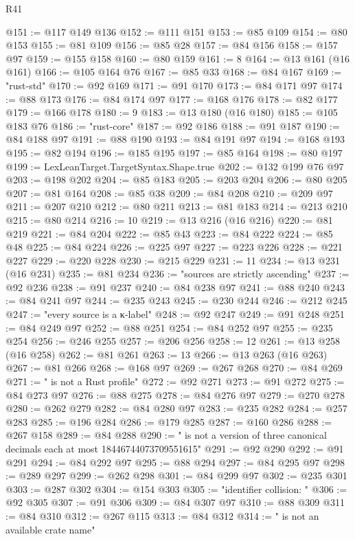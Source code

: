 \begin{lexlean}{R41}
\begin{coremodule}
@151 := @117 @149 @136
@152 := @111 @151
@153 := @85 @109
@154 := @80 @153
@155 := @81 @109
@156 := @85 @28
@157 := @84 @156
@158 := @157 @97
@159 := @155 @158
@160 := @80 @159
@161 := 8
@164 := @13 @161 (@16 @161)
@166 := @105 @164 @76
@167 := @85 @33
@168 := @84 @167
@169 := "rust-std"
@170 := @92 @169
@171 := @91 @170
@173 := @84 @171 @97
@174 := @88 @173
@176 := @84 @174 @97
@177 := @168 @176
@178 := @82 @177
@179 := @166 @178
@180 := 9
@183 := @13 @180 (@16 @180)
@185 := @105 @183 @76
@186 := "rust-core"
@187 := @92 @186
@188 := @91 @187
@190 := @84 @188 @97
@191 := @88 @190
@193 := @84 @191 @97
@194 := @168 @193
@195 := @82 @194
@196 := @185 @195
@197 := @85 @164
@198 := @80 @197
@199 := LexLeanTarget.TargetSyntax.Shape.true
@202 := @132 @199 @76 @97
@203 := @198 @202
@204 := @85 @183
@205 := @203 @204
@206 := @80 @205
@207 := @81 @164
@208 := @85 @38
@209 := @84 @208
@210 := @209 @97
@211 := @207 @210
@212 := @80 @211
@213 := @81 @183
@214 := @213 @210
@215 := @80 @214
@216 := 10
@219 := @13 @216 (@16 @216)
@220 := @81 @219
@221 := @84 @204
@222 := @85 @43
@223 := @84 @222
@224 := @85 @48
@225 := @84 @224
@226 := @225 @97
@227 := @223 @226
@228 := @221 @227
@229 := @220 @228
@230 := @215 @229
@231 := 11
@234 := @13 @231 (@16 @231)
@235 := @81 @234
@236 := "sources are strictly ascending"
@237 := @92 @236
@238 := @91 @237
@240 := @84 @238 @97
@241 := @88 @240
@243 := @84 @241 @97
@244 := @235 @243
@245 := @230 @244
@246 := @212 @245
@247 := "every source is a κ-label"
@248 := @92 @247
@249 := @91 @248
@251 := @84 @249 @97
@252 := @88 @251
@254 := @84 @252 @97
@255 := @235 @254
@256 := @246 @255
@257 := @206 @256
@258 := 12
@261 := @13 @258 (@16 @258)
@262 := @81 @261
@263 := 13
@266 := @13 @263 (@16 @263)
@267 := @81 @266
@268 := @168 @97
@269 := @267 @268
@270 := @84 @269
@271 := " is not a Rust profile"
@272 := @92 @271
@273 := @91 @272
@275 := @84 @273 @97
@276 := @88 @275
@278 := @84 @276 @97
@279 := @270 @278
@280 := @262 @279
@282 := @84 @280 @97
@283 := @235 @282
@284 := @257 @283
@285 := @196 @284
@286 := @179 @285
@287 := @160 @286
@288 := @267 @158
@289 := @84 @288
@290 := " is not a version of three canonical decimals each at most 18446744073709551615"
@291 := @92 @290
@292 := @91 @291
@294 := @84 @292 @97
@295 := @88 @294
@297 := @84 @295 @97
@298 := @289 @297
@299 := @262 @298
@301 := @84 @299 @97
@302 := @235 @301
@303 := @287 @302
@304 := @154 @303
@305 := "identifier collision: "
@306 := @92 @305
@307 := @91 @306
@309 := @84 @307 @97
@310 := @88 @309
@311 := @84 @310
@312 := @267 @115
@313 := @84 @312
@314 := " is not an available crate name"

\end{coremodule}
\end{lexlean}

